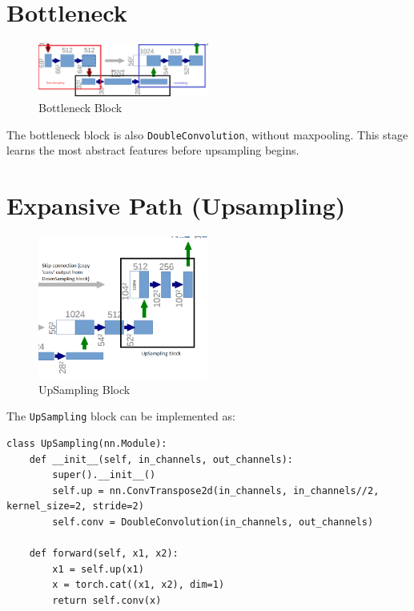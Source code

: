 \documentclass{article}
\begin{document}
\section{Bottleneck}

\begin{figure}[H]
    \centering
    \includegraphics[width=0.5\textwidth]{latex/bottle.png}
    \caption{Bottleneck Block}
    \label{fig:bottleneck}
\end{figure}

The bottleneck block is also \texttt{DoubleConvolution}, without maxpooling. This stage learns the most abstract features before upsampling begins.








\section{Expansive Path (Upsampling)}

\begin{figure}[H]
    \centering
    \includegraphics[width=0.5\textwidth]{latex/upsampling2.png}
    \caption{UpSampling Block}
    \label{fig:upsampling}
\end{figure}

The \texttt{UpSampling} block can be implemented as:

\begin{verbatim}
class UpSampling(nn.Module):
    def __init__(self, in_channels, out_channels):
        super().__init__()
        self.up = nn.ConvTranspose2d(in_channels, in_channels//2, kernel_size=2, stride=2)
        self.conv = DoubleConvolution(in_channels, out_channels)
    
    def forward(self, x1, x2):
        x1 = self.up(x1)
        x = torch.cat((x1, x2), dim=1)
        return self.conv(x)
\end{verbatim}
\end{document}

